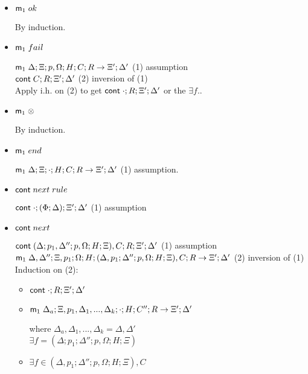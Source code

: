 \begin{itemize}
   \item $\mathsf{m}_1 \; ok$
   
   By induction.
   
   \item $\mathsf{m}_1 \; fail$
   
   $\mathsf{m}_1 \; \Delta; \Xi; p, \Omega; H; C; R \rightarrow \Xi'; \Delta'$ \hfill (1) assumption \\
   $\mathsf{cont} \; C; R; \Xi'; \Delta'$ \hfill (2) inversion of (1) \\
   Apply i.h. on (2) to get $\mathsf{cont} \; \cdot; R; \Xi'; \Delta'$ or the $\exists f.$.
   
   \item $\mathsf{m}_1 \; \otimes$
   
   By induction.
   
   \item $\mathsf{m}_1 \; end$
   
   $\mathsf{m}_1 \; \Delta; \Xi; \cdot; H; C; R \rightarrow \Xi'; \Delta'$ \hfill (1) assumption.\\
   
   \item $\mathsf{cont} \; next \; rule$
   
   $\mathsf{cont} \; \cdot; (\Phi; \Delta); \Xi'; \Delta'$ \hfill (1) assumption \\
   
   \item $\mathsf{cont} \; next$
   
   $\mathsf{cont} \; (\Delta; p_1, \Delta''; p, \Omega; H; \Xi), C; R; \Xi'; \Delta'$ \hfill (1) assumption \\
   $\mathsf{m}_1 \; \Delta, \Delta''; \Xi, p_1;  \Omega; H; (\Delta, p_1; \Delta''; p, \Omega; H; \Xi), C; R \rightarrow \Xi'; \Delta'$ \hfill (2) inversion of (1)\\
   Induction on (2):
   
   \begin{itemize}
      \item $\mathsf{cont} \; \cdot; R; \Xi'; \Delta'$
      
      \item $\mathsf{m}_1 \; \Delta_a; \Xi, p_1, \Delta_1, ..., \Delta_k; \cdot; H; C''; R \rightarrow \Xi'; \Delta'$ 
      
      where $\Delta_a, \Delta_1, ..., \Delta_k = \Delta, \Delta'$ \\
      
      $\exists f = (\Delta; p_1; \Delta''; p, \Omega; H; \Xi)$
      
      \item $\exists f \in (\Delta, p_1; \Delta''; p, \Omega; H; \Xi), C$
      

\end{itemize}
\end{itemize}
